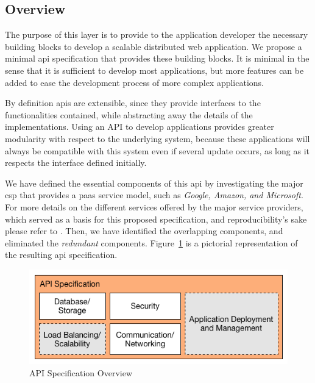 \documentclass[12pt, titlepage]{uo_temp}
\begin{document}
     \subsection{Overview}
     The purpose of this layer is to provide to the application developer the necessary
     building blocks to develop a scalable distributed web application. We propose a
     minimal \gls{api} specification that provides these building blocks. It is minimal in
     the sense that it is sufficient to develop most applications, but more features
     can be added to ease the development process of more complex applications.

     By definition \gls{api}s are extensible, since they provide interfaces to the
     functionalities contained, while abstracting away the details of the
     implementations. Using an API to develop applications provides greater modularity
     with respect to the underlying system, because these applications will always be
     compatible with this system even if several update occurs, as long as it respects the
     interface defined initially.

     We have defined the essential components of this \gls{api} by investigating the major
     \gls{csp} that provides a \gls{paas} service model, such as \emph{Google, Amazon, and
       Microsoft}. For more details on the different services offered by the major service
     providers, which served as a basis for this proposed specification, and
     reproducibility's sake please refer to \cite{gae_web} \cite{AWS} \cite{azure}. Then,
     we have identified the overlapping components, and eliminated the \emph{redundant}
     components. Figure~\ref{api_spec_overview} is a pictorial representation of the
     resulting \gls{api} specification.

     \begin{figure}[h]
       \centering
       \includegraphics[width=125mm]{images/api_overview.png}
     \caption{API Specification Overview}
     \label{api_spec_overview}
     \end{figure}
\end{document}
